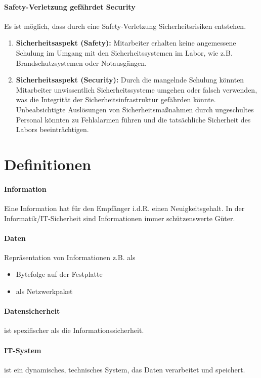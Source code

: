 \documentclass{book}
\begin{document}
\paragraph{Safety-Verletzung gefährdet Security} Es ist möglich, dass durch eine Safety-Verletzung Sicherheitsrisiken entstehen.
\begin{enumerate}[label=\arabic*.]
    \item \textbf{Sicherheitsaspekt (Safety):} Mitarbeiter erhalten keine angemessene Schulung im Umgang mit den Sicherheitssystemen im Labor, wie z.B. Brandschutzsystemen oder Notausgängen.

    \item \textbf{Sicherheitsaspekt (Security):} Durch die mangelnde Schulung könnten Mitarbeiter unwissentlich Sicherheitssysteme umgehen oder falsch verwenden, was die Integrität der Sicherheitsinfrastruktur gefährden könnte. Unbeabsichtigte Auslösungen von Sicherheitsmaßnahmen durch ungeschultes Personal könnten zu Fehlalarmen führen und die tatsächliche Sicherheit des Labors beeinträchtigen.

\end{enumerate}
\section{Definitionen}
\paragraph{Information}
Eine Information hat für den Empfänger i.d.R. einen Neuigkeitsgehalt. 
In der Informatik/IT-Sicherheit sind Informationen immer schützenswerte Güter. 
\paragraph{Daten} Repräsentation von Informationen z.B. als 
\begin{itemize}
    \item Bytefolge auf der Festplatte
    \item als Netzwerkpaket
\end{itemize}
\paragraph{Datensicherheit} ist spezifischer als die Informationssicherheit.
\paragraph{IT-System} ist ein dynamisches, technisches System, das Daten verarbeitet und speichert.
\end{document}
